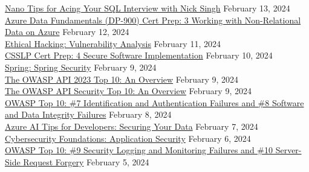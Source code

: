 \documentclass[10pt]{res} %
\begin{document}
\begin{resume}
\href{https://www.linkedin.com/learning/certificates/62c549a07b4cd10a8aea6a80ac38d34e157d258fd3f0ab607ea5738cdcc6daf0}{\color{blue}Nano Tips for Acing Your SQL Interview with Nick Singh} \hfill February 13, 2024 \\
\href{https://www.linkedin.com/learning/certificates/d96348144b73605aa66c771f70df969209e28e0af89a7054b25ae297e3462b31}{\color{blue}Azure Data Fundamentals (DP-900) Cert Prep: 3 Working with Non-Relational Data on Azure} \hfill February 12, 2024 \\
\href{https://www.linkedin.com/learning/certificates/459bb73d905f77c981f0179d8df35991f1978ab30b93f1193386705139ca85bf}{\color{blue}Ethical Hacking: Vulnerability Analysis} \hfill February 11, 2024 \\
\href{https://www.linkedin.com/learning/certificates/c4393f8f8819cfa8234ef620b597c2c3b2ff8c0178e29e00babe9a4e4e55bd1a}{\color{blue}CSSLP Cert Prep: 4 Secure Software Implementation} \hfill February 10, 2024 \\
\href{https://www.linkedin.com/learning/certificates/6527478421de16e215bea434a6aad12bc7b73a393f29bbf158c2aae6d2fa83c4}{\color{blue}Spring: Spring Security} \hfill February 9, 2024 \\
\href{https://www.linkedin.com/learning/certificates/5830510bbc1745633d7bf27248f13df3488a77221733721148dacc73d4eec4e9}{\color{blue}The OWASP API 2023 Top 10: An Overview} \hfill February 9, 2024 \\
\href{https://www.linkedin.com/learning/certificates/26e65e2be6c3aae2420f2b5fda687a7c6d6f0fb2e6858b603613f4094a3a9d85}{\color{blue}The OWASP API Security Top 10: An Overview} \hfill February 9, 2024 \\
\href{https://www.linkedin.com/learning/certificates/9e1fa14bb10d8771617e3514d6f6508f46ce6ee0f84f359f92f546dea597d6e7}{\color{blue}OWASP Top 10: \#7 Identification and Authentication Failures and \#8 Software and Data Integrity Failures} \hfill February 8, 2024 \\
\href{https://www.linkedin.com/learning/certificates/9b38eb0d8e97d5f892f09079c4ff30192d9771aa1d934a85a3785e0ce2ceb713}{\color{blue}Azure AI Tips for Developers: Securing Your Data} \hfill February 7, 2024 \\
\href{https://www.linkedin.com/learning/certificates/2c95ecd692eb151bdde1855ca6bc76e6690af8334c229404c42667e514097149}{\color{blue}Cybersecurity Foundations: Application Security} \hfill February 6, 2024 \\
\href{https://www.linkedin.com/learning/certificates/d7b3400246a70c0de1757cae63c9257ecd9a12ac1d76a429bd3c59d7dcfcb780}{\color{blue}OWASP Top 10: \#9 Security Logging and Monitoring Failures and \#10 Server-Side Request Forgery} \hfill February 5, 2024 \\

\end{resume}
\end{document}
